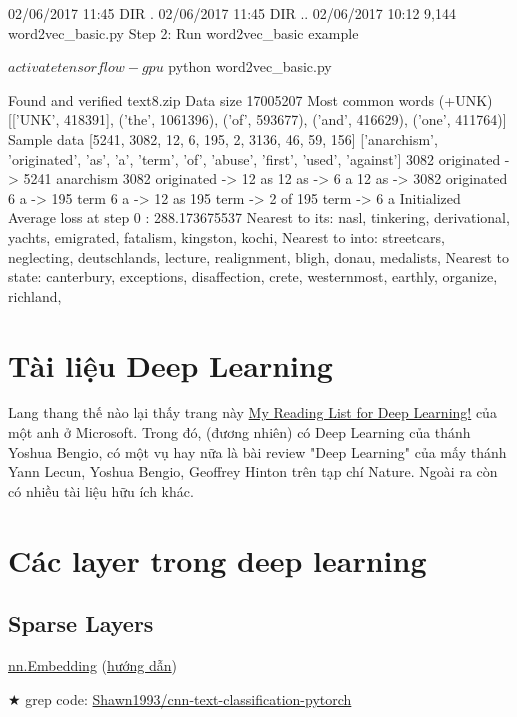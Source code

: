 02/06/2017 11:45 DIR .
02/06/2017 11:45 DIR ..
02/06/2017 10:12 9,144 word2vec_basic.py
Step 2: Run word2vec_basic example

$ activate tensorflow-gpu
$ python word2vec_basic.py

Found and verified text8.zip
Data size 17005207
Most common words (+UNK) [['UNK', 418391], ('the', 1061396), ('of', 593677), ('and', 416629), ('one', 411764)]
Sample data [5241, 3082, 12, 6, 195, 2, 3136, 46, 59, 156] ['anarchism', 'originated', 'as', 'a', 'term', 'of', 'abuse',
'first', 'used', 'against']
3082 originated -> 5241 anarchism
3082 originated -> 12 as
12 as -> 6 a
12 as -> 3082 originated
6 a -> 195 term
6 a -> 12 as
195 term -> 2 of
195 term -> 6 a
Initialized
Average loss at step 0 : 288.173675537
Nearest to its: nasl, tinkering, derivational, yachts, emigrated, fatalism, kingston, kochi,
Nearest to into: streetcars, neglecting, deutschlands, lecture, realignment, bligh, donau, medalists,
Nearest to state: canterbury, exceptions, disaffection, crete, westernmost, earthly, organize, richland,

\section{Tài liệu Deep Learning}

Lang thang thế nào lại thấy trang này \href{https://www.microsoft.com/en-us/research/wp-content/uploads/2017/02/DL_Reading_List.pdf}{My Reading List for Deep Learning!} của một anh ở Microsoft. Trong đó, (đương nhiên) có Deep Learning của thánh Yoshua Bengio, có một vụ hay nữa là bài review "Deep Learning" của mấy thánh Yann Lecun, Yoshua Bengio, Geoffrey Hinton trên tạp chí Nature. Ngoài ra còn có nhiều tài liệu hữu ích khác.

\section{Các layer trong deep learning}

\subsection{Sparse Layers}

\href{http://pytorch.org/docs/master/nn.html#embedding}{nn.Embedding} (\href{http://pytorch.org/tutorials/beginner/nlp/word_embeddings_tutorial.html}{hướng dẫn})

★ grep code: \href{https://github.com/Shawn1993/cnn-text-classification-pytorch/blob/master/model.py#L18}{Shawn1993/cnn-text-classification-pytorch}

